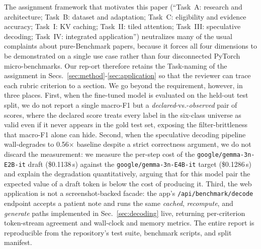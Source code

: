 \documentclass[conference]{IEEEtran}
\newcommand{\code}[1]{\texttt{\small #1}}
\newcommand{\modelname}{\texttt{google/gemma-3n-E4B-it}}
\newcommand{\draftname}{\texttt{google/gemma-3n-E2B-it}}
\begin{document}
The assignment framework that motivates this paper
(``Task~A: research and architecture; Task~B: dataset and
adaptation; Task~C: eligibility and evidence accuracy;
Task~I: KV caching; Task~II: tiled attention;
Task~III: speculative decoding; Task~IV: integrated application'')
neutralizes many of the usual complaints about pure-Benchmark papers,
because it forces all four dimensions to be demonstrated on a single
use case rather than four disconnected PyTorch micro-benchmarks. Our
rep-ort therefore retains the Task-naming of the assignment in
Secs.~\ref{sec:method}-\ref{sec:application} so that the reviewer can
trace each rubric criterion to a section. We go beyond the requirement,
however, in three places.
%
First, when the fine-tuned model is evaluated on the held-out test
split, we do not report a single macro-F1 but a
\emph{declared}-vs.-\emph{observed} pair of scores, where the declared
score treats every label in the six-class universe as valid even if it
never appears in the gold test set, exposing the filter-brittleness
that macro-F1 alone can hide. Second, when the
speculative decoding pipeline wall-degrades to 0.56$\times$
baseline despite a strict correctness argument, we do not discard the
measurement: we measure the per-step cost of the \draftname{}
draft (\$0.1138\,s) against the \modelname{} target
(\$0.1286\,s) and explain the degradation quantitatively, arguing that
for this model pair the expected value of a draft token is below the
cost of producing it. Third, the web application is not a
screenshot-backed facade: the app's \code{/api/benchmark/decode}
endpoint accepts a patient note and runs the same \emph{cached},
\emph{recompute}, and \emph{generate} paths implemented in
Sec.~\ref{sec:decoding} live, returning per-criterion token-stream
agreement and wall-clock and memory metrics. The entire report is
reproducible from the repository's test suite, benchmark scripts, and
split manifest.
\end{document}
